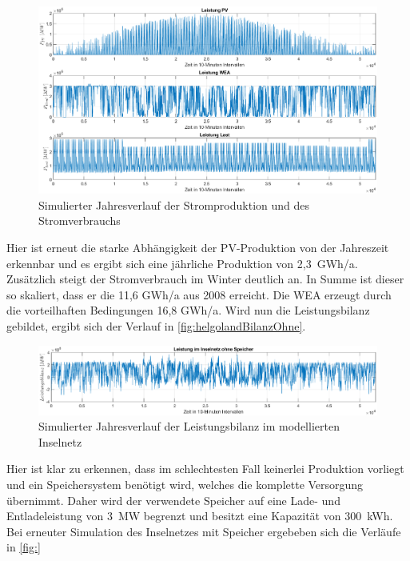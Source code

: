 \begin{figure}[H]
	\centering
	\includegraphics[width=\linewidth]{Abbildungen/HelgolandLeistungOhne.eps}
	\caption{Simulierter Jahresverlauf der Stromproduktion und des Stromverbrauchs}
	\label{fig:helgolandVerlaufOhne}
\end{figure}

Hier ist erneut die starke Abhängigkeit der PV-Produktion von der Jahreszeit erkennbar und es ergibt sich eine jährliche Produktion von 2,3~GWh/a. Zusätzlich steigt der Stromverbrauch im Winter deutlich an. In Summe ist dieser so skaliert, dass er die 11,6 GWh/a aus 2008 erreicht. Die WEA erzeugt durch die vorteilhaften Bedingungen 16,8 GWh/a. Wird nun die Leistungsbilanz gebildet, ergibt sich der Verlauf in \autoref{fig:helgolandBilanzOhne}.

\begin{figure}[H]
	\centering
	\includegraphics[width=\linewidth]{Abbildungen/HelgolandBilanzOhne.eps}
	\caption{Simulierter Jahresverlauf der Leistungsbilanz im modellierten Inselnetz}
	\label{fig:helgolandBilanzOhne}
\end{figure}

Hier ist klar zu erkennen, dass im schlechtesten Fall keinerlei Produktion vorliegt und ein Speichersystem benötigt wird, welches die komplette Versorgung übernimmt. Daher wird der verwendete Speicher auf eine Lade- und Entladeleistung von 3~MW begrenzt und besitzt eine Kapazität von 300~kWh. Bei erneuter Simulation des Inselnetzes mit Speicher ergebeben sich die Verläufe in \autoref{fig:}

